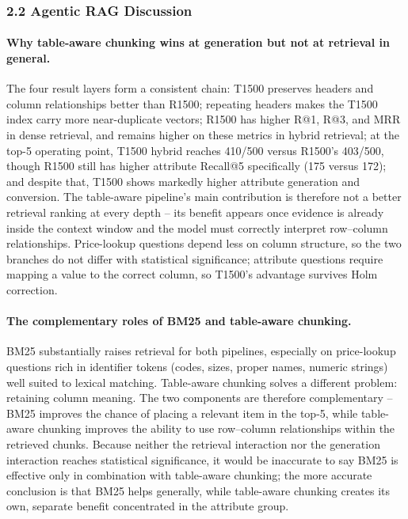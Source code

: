 \documentclass[11pt,a4paper]{article}
\begin{document}
\subsubsection{2.2 Agentic RAG Discussion}

\paragraph{Why table-aware chunking wins at generation but not at retrieval
in general.}
The four result layers form a consistent chain: T1500 preserves headers and
column relationships better than R1500; repeating headers makes the T1500
index carry more near-duplicate vectors; R1500 has higher R@1, R@3, and MRR
in dense retrieval, and remains higher on these metrics in hybrid retrieval;
at the top-5 operating point, T1500 hybrid reaches 410/500 versus R1500's
403/500, though R1500 still has higher attribute Recall@5 specifically
(175 versus 172); and despite that, T1500 shows markedly higher attribute
generation and conversion. The table-aware pipeline's main contribution is
therefore not a better retrieval ranking at every depth -- its benefit
appears once evidence is already inside the context window and the model
must correctly interpret row--column relationships. Price-lookup questions
depend less on column structure, so the two branches do not differ with
statistical significance; attribute questions require mapping a value to
the correct column, so T1500's advantage survives Holm correction.

\paragraph{The complementary roles of BM25 and table-aware chunking.}
BM25 substantially raises retrieval for both pipelines, especially on
price-lookup questions rich in identifier tokens (codes, sizes, proper
names, numeric strings) well suited to lexical matching. Table-aware
chunking solves a different problem: retaining column meaning. The two
components are therefore complementary -- BM25 improves the chance of
placing a relevant item in the top-5, while table-aware chunking improves
the ability to use row--column relationships within the retrieved chunks.
Because neither the retrieval interaction nor the generation interaction
reaches statistical significance, it would be inaccurate to say BM25 is
effective only in combination with table-aware chunking; the more accurate
conclusion is that BM25 helps generally, while table-aware chunking creates
its own, separate benefit concentrated in the attribute group.
\end{document}
